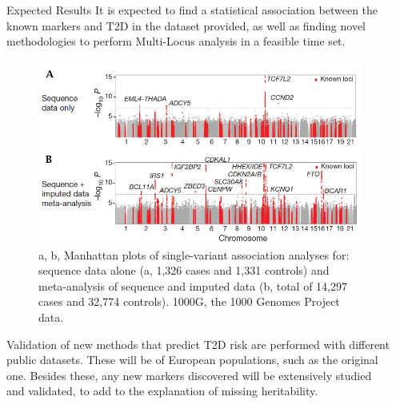 \documentclass[final]{beamer}
\newlength{\sepmargin}
\newlength{\onecolwid}
\begin{document}
\begin{frame}[t]
\begin{columns}[t]
\begin{column}{\onecolwid}
          \begin{block}{Expected Results}
				It is expected to find a statistical association between the known markers and T2D in the dataset provided, as well as finding novel methodologies to perform Multi-Locus analysis in a feasible time set.
				\begin{figure}
                    \includegraphics[width=1\linewidth]{markers.PNG}                     			\caption{a, b, Manhattan plots of single-variant association analyses for: sequence
data alone (a, 1,326 cases and 1,331 controls) and meta-analysis of
sequence and imputed data (b, total of 14,297 cases and 32,774 controls).
1000G, the 1000 Genomes Project data\cite{fuchsberger2016genetic, 10002012integrated}.}
				\end{figure}
             Validation of new methods that predict T2D risk are performed with different public datasets. These will be of European populations, such as the original one. Besides these, any new markers discovered will be extensively studied and validated, to add to the explanation of missing heritability.
             \end{block}
          
      \end{column}
      \begin{column}{\sepmargin} \end{column}
      \end{columns} 
       

\end{frame}
\end{document}
